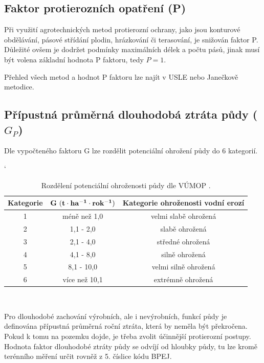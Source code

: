 \subsection{Faktor protierozních opatření (P)}
Při využití agrotechnických metod protierozní ochrany, jako jsou
konturové obdělávání, pásové střídání plodin, hrázkování či
terasování, je snižován faktor P. Důležité ovšem je dodržet podmínky
maximálních délek a počtu pásů, jinak musí být volena základní hodnota
P faktoru, tedy $P=1$.

Přehled všech metod a hodnot P faktoru lze najít v USLE\cite{usle1978}
nebo Janečkově metodice\cite{janecek2012}.

\subsection{Přípustná průměrná dlouhodobá ztráta půdy ($G_P$)}
Dle vypočteného faktoru G lze rozdělit potenciální ohrožení půdy do 6
kategorií.\cite{vumop}

\begin{table}[!h]
\begin{center}
\catcode`
    \noindent\begin{tabular}{|*{3}{c|}} \hline \bf Kategorie & \bf
    $\bf G~(t\cdot ha^{-1}\cdot rok^{-1})$ & \bf Kategorie ohroženosti
    vodní erozí\\ \hline 1 & méně než 1,0 & velmi slabě
    ohrožená\\ \hline 2 & 1,1 - 2,0 & slabě ohrožená\\ \hline 3 & 2,1
    - 4,0 & středné ohrožená\\ \hline 4 & 4,1 - 8,0 & silně
    ohrožená\\ \hline 5 & 8,1 - 10,0 & velmi silně ohrožená\\ \hline 6
    & více než 10,1 & extrémně ohrožená\\ \hline
    \end{tabular}\\
  \caption[Rozdělení potenciální ohroženosti půdy]{Rozdělení
    potenciální ohroženosti půdy dle VÚMOP \cite{vumop}.}
  \label{tabulka_ohrozenost}
\end{center}
\end{table}
\FloatBarrier Pro dlouhodobé zachování výrobních, ale i nevýrobních,
funkcí půdy je definována přípustná průměrná roční ztráta, která by
neměla být překročena. Pokud k tomu na pozemku dojde, je třeba zvolit
účinnější protierozní postupy. Hodnota faktor dlouhodobé ztráty půdy
se odvíjí od hloubky půdy, tu lze kromě terénního měření určit rovněž
z 5. číslice kódu BPEJ.\cite{janecek2012}

